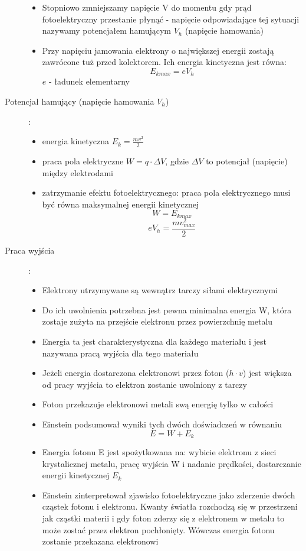 \documentclass[a4paper,11pt]{article}
\begin{document}
\begin{description}
\begin{itemize}
  \item Stopniowo zmniejszamy napięcie V do momentu gdy prąd fotoelektryczny przestanie płynąć - napięcie odpowiadające tej sytuacji nazywamy potencjałem hamującym $V_h$ (napięcie hamowania)
  \item Przy napięciu jamowania elektrony o największej energii zostają zawrócone tuż przed kolektorem. Ich energia kinetyczna jest równa:
    $$E_{kmax} = eV_h$$
    $e$ - ładunek elementarny
  \end{itemize}
\item[Potencjał hamujący (napięcie hamowania $V_h$)]:\\
  \begin{itemize}
  \item energia kinetyczna $E_k = \frac{mv^2}{2}$
  \item praca pola elektryczne $W = q\cdot\Delta V$, gdzie $\Delta V$ to potencjał (napięcie) między elektrodami
  \item zatrzymanie efektu fotoelektrycznego: praca pola elektrycznego musi być równa maksymalnej energii kinetycznej
    $$W=E_{kmax}$$
    $$eV_h = \frac{mv^2_{max}}{2}$$
  \end{itemize}
\item[Praca wyjścia]:
  \begin{itemize}
  \item Elektrony utrzymywane są wewnątrz tarczy siłami elektrycznymi
  \item Do ich uwolnienia potrzebna jest pewna minimalna energia W, która zostaje zużyta na przejście elektronu przez powierzchnię metalu
  \item Energia ta jest charakterystyczna dla każdego materiału i jest nazywana pracą wyjścia dla tego materiału
  \item Jeżeli energia dostarczona elektronowi przez foton ($h\cdot v$) jest większa od pracy wyjścia to elektron zostanie uwolniony z tarczy
  \item Foton przekazuje elektronowi metali swą energię tylko w całości
  \item Einstein podsumował wyniki tych dwóch doświadczeń w równaniu
    $$E = W + E_k$$
  \item Energia fotonu E jest spożytkowana na: wybicie elektronu z sieci krystalicznej metalu, pracę wyjścia W i nadanie prędkości, dostarczanie energii kinetycznej $E_k$
  \item Einstein zinterpretował zjawisko fotoelektryczne jako zderzenie dwóch cząstek fotonu i elektronu. Kwanty światła rozchodzą się w przestrzeni jak cząstki materii i gdy foton zderzy się z elektronem w metalu to może zostać przez elektron pochłonięty. Wówczas energia fotonu zostanie przekazana elektronowi

\end{itemize}
\end{description}
\end{document}
